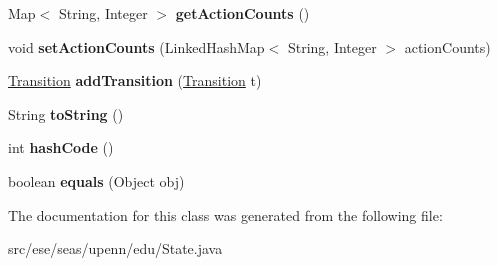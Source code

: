 \begin{DoxyCompactItemize}
\item 
\hypertarget{classese_1_1seas_1_1upenn_1_1edu_1_1_state_a5cab4a963a7af4b95809de7fa106d02c}{}Map$<$ String, Integer $>$ {\bfseries get\+Action\+Counts} ()\label{classese_1_1seas_1_1upenn_1_1edu_1_1_state_a5cab4a963a7af4b95809de7fa106d02c}

\item 
\hypertarget{classese_1_1seas_1_1upenn_1_1edu_1_1_state_a6619cae7d9f2e5ce815f88d819d3eb84}{}void {\bfseries set\+Action\+Counts} (Linked\+Hash\+Map$<$ String, Integer $>$ action\+Counts)\label{classese_1_1seas_1_1upenn_1_1edu_1_1_state_a6619cae7d9f2e5ce815f88d819d3eb84}

\item 
\hypertarget{classese_1_1seas_1_1upenn_1_1edu_1_1_state_a01295ee4b9e3b27146805b44349c482b}{}\hyperlink{classese_1_1seas_1_1upenn_1_1edu_1_1_transition}{Transition} {\bfseries add\+Transition} (\hyperlink{classese_1_1seas_1_1upenn_1_1edu_1_1_transition}{Transition} t)\label{classese_1_1seas_1_1upenn_1_1edu_1_1_state_a01295ee4b9e3b27146805b44349c482b}

\item 
\hypertarget{classese_1_1seas_1_1upenn_1_1edu_1_1_state_a1724aba4281e960ec3be7d2d6848e5c0}{}String {\bfseries to\+String} ()\label{classese_1_1seas_1_1upenn_1_1edu_1_1_state_a1724aba4281e960ec3be7d2d6848e5c0}

\item 
\hypertarget{classese_1_1seas_1_1upenn_1_1edu_1_1_state_acf160eec0ee396407b972335c26196e3}{}int {\bfseries hash\+Code} ()\label{classese_1_1seas_1_1upenn_1_1edu_1_1_state_acf160eec0ee396407b972335c26196e3}

\item 
\hypertarget{classese_1_1seas_1_1upenn_1_1edu_1_1_state_a06e902ef5ac632718ef1742752dcc926}{}boolean {\bfseries equals} (Object obj)\label{classese_1_1seas_1_1upenn_1_1edu_1_1_state_a06e902ef5ac632718ef1742752dcc926}

\end{DoxyCompactItemize}


The documentation for this class was generated from the following file\+:\begin{DoxyCompactItemize}
\item 
src/ese/seas/upenn/edu/State.\+java\end{DoxyCompactItemize}

